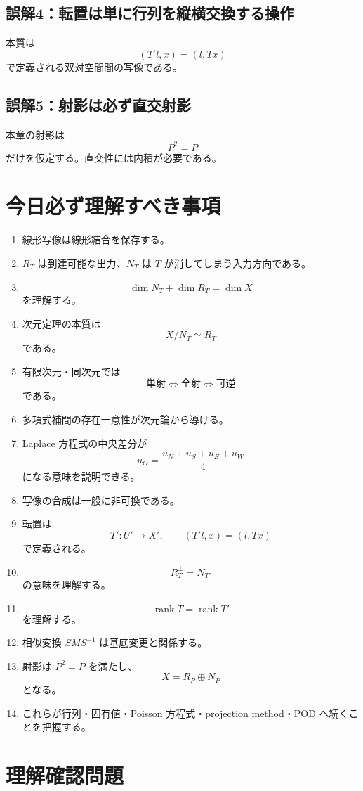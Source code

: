 \documentclass[a4paper,11pt]{ltjsarticle}
\newcommand{\rank}{\operatorname{rank}}
\begin{document}
\subsection*{誤解4：転置は単に行列を縦横交換する操作}
本質は
\[
(T'l,x)=(l,Tx)
\]
で定義される双対空間間の写像である。

\subsection*{誤解5：射影は必ず直交射影}
本章の射影は
\[
P^2=P
\]
だけを仮定する。直交性には内積が必要である。

\section{今日必ず理解すべき事項}

\begin{enumerate}
  \item 線形写像は線形結合を保存する。
  \item $R_T$ は到達可能な出力、$N_T$ は $T$ が消してしまう入力方向である。
  \item
  \[
  \boxed{\dim N_T+\dim R_T=\dim X}
  \]
  を理解する。
  \item 次元定理の本質は
  \[
  \boxed{X/N_T\simeq R_T}
  \]
  である。
  \item 有限次元・同次元では
  \[
  \boxed{\text{単射}\iff\text{全射}\iff\text{可逆}}
  \]
  である。
  \item 多項式補間の存在一意性が次元論から導ける。
  \item Laplace 方程式の中央差分が
  \[
  u_O=\frac{u_N+u_S+u_E+u_W}{4}
  \]
  になる意味を説明できる。
  \item 写像の合成は一般に非可換である。
  \item 転置は
  \[
  T':U'\to X',\qquad (T'l,x)=(l,Tx)
  \]
  で定義される。
  \item
  \[
  \boxed{R_T^\perp=N_{T'}}
  \]
  の意味を理解する。
  \item
  \[
  \boxed{\rank T=\rank T'}
  \]
  を理解する。
  \item 相似変換 $SMS^{-1}$ は基底変更と関係する。
  \item 射影は $P^2=P$ を満たし、
  \[
  \boxed{X=R_P\oplus N_P}
  \]
  となる。
  \item これらが行列・固有値・Poisson 方程式・projection method・POD へ続くことを把握する。
\end{enumerate}

\section{理解確認問題}
\end{document}
